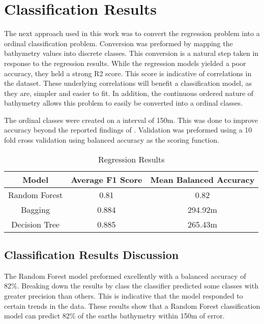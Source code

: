\section{Classification Results}
\setlength{\parindent}{10ex}
The next approach used in this work was to convert the regression problem into a ordinal classification problem.
Conversion was preformed by mapping the bathymetry values into discrete classes.
This conversion is a natural step taken in response to the regression results.
While the regression models yielded a poor accuracy, they held a strong R2 score.
This score is indicative of correlations in the dataset.
These underlying correlations will benefit a classification model, as they are, simpler and easier to fit.
In addition, the continuous ordered nature of bathymetry allows this problem to easily be converted into a ordinal classes.

\par
The ordinal classes were created on a interval of 150m.
This was done to improve accuracy beyond the reported findings of \cite{jena2012prediction}.
Validation was preformed using a 10 fold cross validation using balanced accuracy as the scoring function.

\begin{center}
    \begin{table}[htb]
        \begin{tabular}{|c c c|}
            \hline
			\textbf{Model} & \textbf{Average F1 Score} & \textbf{Mean Balanced Accuracy} \\
			\hline
			Random Forest & 0.81 & 0.82 \\
            Bagging & 0.884 & 294.92m \\
            Decision Tree & 0.885 & 265.43m \\
			\hline
        \end{tabular}
        \label{table:CLASSIFICATION_RESULTS}
        \caption{Regression Results}
    \end{table}
\end{center}

\subsection{Classification Results Discussion}
The Random Forest model preformed excellently with a balanced accuracy of 82\%.
Breaking down the results by class the classifier predicted some classes with greater precision than others.
This is indicative that the model responded to certain trends in the data.
These results show that a Random Forest classification model can predict 82\% of the earths bathymetry within 150m of error.

